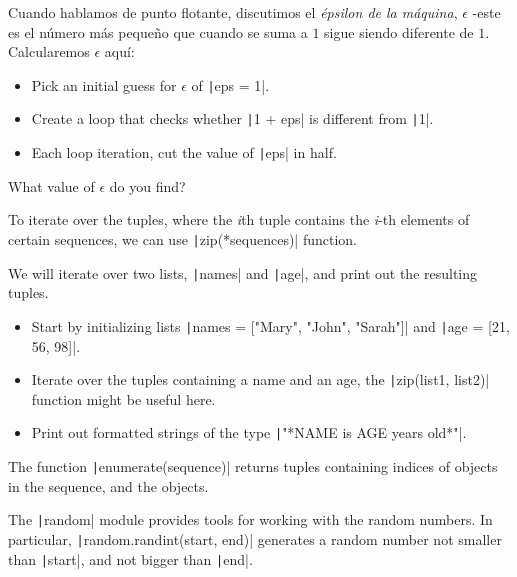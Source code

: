 \begin{questions}
	\question

	Cuando hablamos de punto flotante, discutimos el
	\textit{épsilon de la máquina}, $\epsilon$ -este es el número más
	pequeño que cuando se suma a $1$ sigue siendo diferente de $1$.
	Calcularemos $\epsilon$ aquí:
	\begin{itemize}
		\item Pick an initial guess for $\epsilon$ of \texttt|eps = 1|.
		\item Create a loop that checks whether \texttt|1 + eps| is different from \texttt|1|.
		\item Each loop iteration, cut the value of \texttt|eps| in half.
	\end{itemize}
	What value of $\epsilon$ do you find?

	\question

	To iterate over the tuples, where the \textit{i}th tuple contains
	the \textit{i}-th elements of certain sequences, we can use
	\texttt|zip(*sequences)| function.

	We will iterate over two lists, \texttt|names| and
	\texttt|age|, and print out the resulting tuples.

	\begin{itemize}
		\item

		      Start by initializing lists
		      \texttt|names = ["Mary", "John", "Sarah"]| and
		      \texttt|age = [21, 56, 98]|.

		\item

		      Iterate over the tuples containing a name and an age, the
		      \texttt|zip(list1, list2)| function might be
		      useful here.

		\item

		      Print out formatted strings of the type
		      \texttt|"*NAME is AGE years old*"|.
	\end{itemize}

	\question

	The function \texttt|enumerate(sequence)| returns
	tuples containing indices of objects in the sequence, and the
	objects.

	The \texttt|random| module provides tools for working
	with the random numbers.
	In particular, \texttt|random.randint(start, end)|
	generates a random number not smaller than
	\texttt|start|, and not bigger than
	\texttt|end|.


\end{questions}
